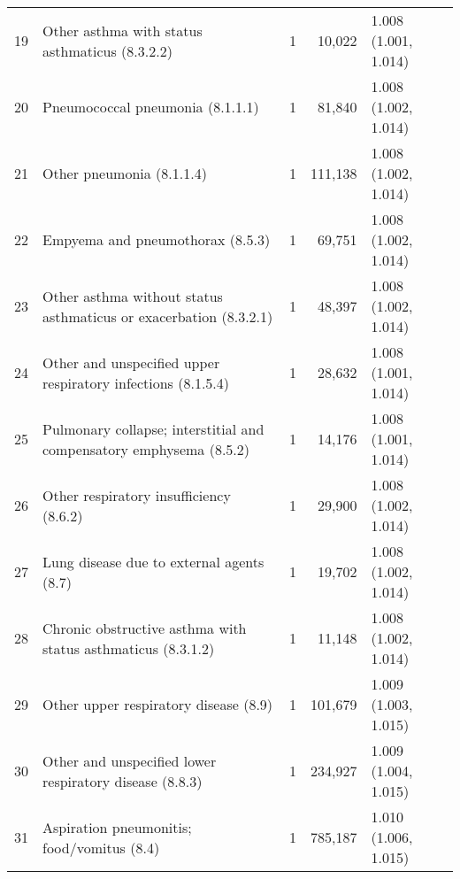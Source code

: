 \begin{tabular}{lp{6.5cm}rrp{2.2cm}}
    19 & Other asthma with status asthmaticus (8.3.2.2) &    1 & 10,022 & 1.008 (1.001, 1.014) \\ 
    20 & Pneumococcal pneumonia (8.1.1.1) &    1 & 81,840 & 1.008 (1.002, 1.014) \\ 
    21 & Other pneumonia (8.1.1.4) &    1 & 111,138 & 1.008 (1.002, 1.014) \\ 
    22 & Empyema and pneumothorax (8.5.3) &    1 & 69,751 & 1.008 (1.002, 1.014) \\ 
    23 & Other asthma without status asthmaticus or exacerbation (8.3.2.1) &    1 & 48,397 & 1.008 (1.002, 1.014) \\ 
    24 & Other and unspecified upper respiratory infections (8.1.5.4) &    1 & 28,632 & 1.008 (1.001, 1.014) \\ 
    25 & Pulmonary collapse; interstitial and compensatory emphysema (8.5.2) &    1 & 14,176 & 1.008 (1.001, 1.014) \\ 
    26 & Other respiratory insufficiency (8.6.2) &    1 & 29,900 & 1.008 (1.002, 1.014) \\ 
    27 & Lung disease due to external agents (8.7) &    1 & 19,702 & 1.008 (1.002, 1.014) \\ 
    28 & Chronic obstructive asthma with status asthmaticus (8.3.1.2) &    1 & 11,148 & 1.008 (1.002, 1.014) \\ 
    29 & Other upper respiratory disease (8.9) &    1 & 101,679 & 1.009 (1.003, 1.015) \\ 
    30 & Other and unspecified lower respiratory disease (8.8.3) &    1 & 234,927 & 1.009 (1.004, 1.015) \\ 
    31 & Aspiration pneumonitis; food/vomitus (8.4) &    1 & 785,187 & 1.010 (1.006, 1.015) \\ 
   \hline
\end{tabular}


